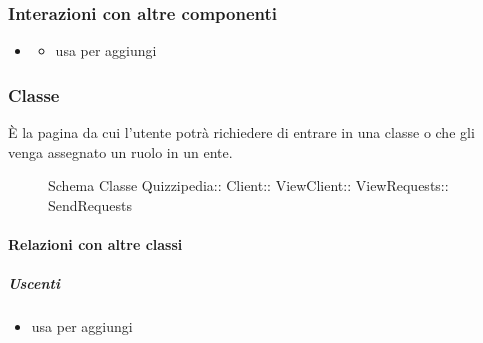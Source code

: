 \subsubsection{Interazioni con altre componenti}
\begin{itemize}
\item {}
\begin{itemize}
\item usa  per aggiungi
\end{itemize}
\end{itemize}
\subsubsection{Classe }
È la pagina da cui l'utente potrà richiedere di entrare in una classe o che gli venga assegnato un ruolo in un ente.
\begin{figure}[H]
\centering
\noindent{}
\caption[Schema Classe SendRequests]{Schema Classe Quizzipedia:: Client:: ViewClient:: ViewRequests:: SendRequests}
\end{figure}
\paragraph{Relazioni con altre classi}
\subparagraph{Uscenti}
\begin{itemize}
\item usa  per aggiungi
\end{itemize}
